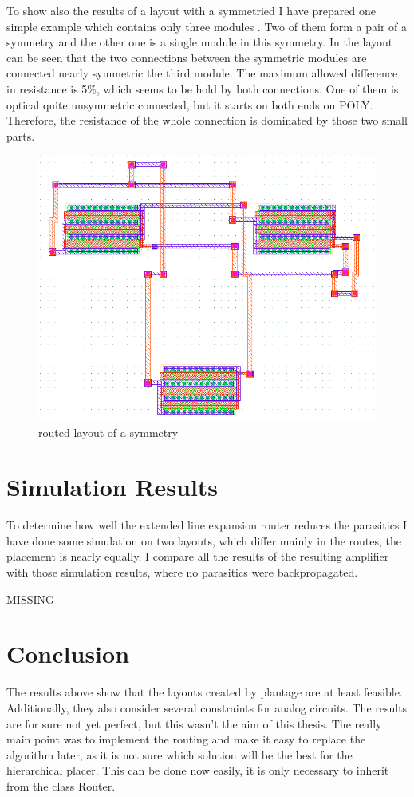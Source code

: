 To show also the results of a layout with a symmetried I have prepared one simple example which contains only three modules . Two of them form a pair of a symmetry and the other one is a single module in this symmetry. In the layout can be seen that the two connections between the symmetric modules are connected nearly symmetric the third module. The maximum allowed difference in resistance is 5\%, which seems to be hold by both connections. One of them is optical quite unsymmetric connected, but it starts on both ends on POLY. Therefore, the resistance of the whole connection is dominated by those two small parts.

\begin{figure}
	\centering
	\includegraphics[scale=.4]{FIG/symmetry_routed.png}
  	\caption{routed layout of a symmetry}
	\label{fig:symmetry_routed}
\end{figure}

\section{Simulation Results}
To determine how well the extended line expansion router reduces the parasitics I have done some simulation on two layouts, which differ mainly in the routes, the placement is nearly equally. I compare all the results of the resulting amplifier with those simulation results, where no parasitics were backpropagated.

MISSING

\section{Conclusion}
The results above show that the layouts created by plantage are at least feasible. Additionally, they also consider several constraints for analog circuits. The results are for sure not yet perfect, but this wasn't the aim of this thesis. The really main point was to implement the routing and make it easy to replace the algorithm later, as it is not sure which solution will be the best for the hierarchical placer. This can be done now easily, it is only necessary to inherit from the class Router.

